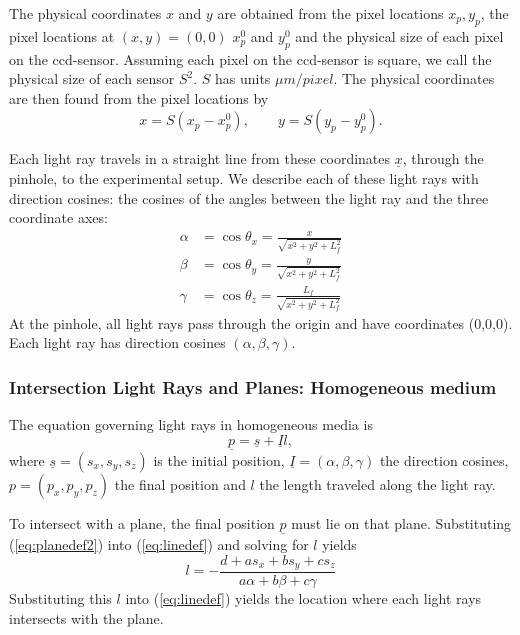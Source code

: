 \documentclass{article}
\begin{document}
The physical coordinates $x$ and $y$ are obtained from the pixel locations $x_p, y_p$, the pixel locations at $(x,y)=(0,0)$ $x_p^0$ and $y_p^0$ and the physical size of each pixel on the ccd-sensor. Assuming each pixel on the ccd-sensor is square, we call the physical size of each sensor $S^2$. $S$ has units $\mu m/pixel$. The physical coordinates are then found from the pixel locations by
\begin{equation}
	x = S (x_p-x_p^0), \qquad  y = S (y_p-y_p^0).
\end{equation}

Each light ray travels in a straight line from these coordinates $\underline{x}$, through the pinhole, to the experimental setup. We describe each of these light rays with direction cosines: the cosines of the angles between the light ray and the three coordinate axes:
\begin{align}
\label{eq:directioncosines}
	\alpha &= \cos \theta_x = \frac{x}{\sqrt{x^2+y^2+L_f^2}} \nonumber \\
	\beta &= \cos \theta_y = \frac{y}{\sqrt{x^2+y^2+L_f^2}} \\
	\gamma &= \cos \theta_z = \frac{L_f}{\sqrt{x^2+y^2+L_f^2}} \nonumber
\end{align}
At the pinhole, all light rays pass through the origin and have coordinates (0,0,0). Each light ray has direction cosines $(\alpha, \beta, \gamma)$.

\subsubsection{Intersection Light Rays and Planes: Homogeneous medium}
The equation governing light rays in homogeneous media is
\begin{equation}
	\label{eq:linedef}
   \underline{p} = \underline{s} + \underline{I} l,
\end{equation}
where $\underline{s} = (s_x, s_y, s_z)$ is the initial position, $\underline{I} = (\alpha, \beta, \gamma)$ the direction cosines, $p = (p_x, p_y, p_z)$ the final position and $l$ the length traveled along the light ray. %

To intersect with a plane, the final position $\underline{p}$ must lie on that plane. Substituting (\ref{eq:planedef2}) into (\ref{eq:linedef}) and solving for $l$ yields 
\begin{equation}
	l = - \frac{d + a s_x + b s_y + c s_z}{a \alpha + b \beta + c \gamma}
\end{equation}
Substituting this $l$ into (\ref{eq:linedef}) yields the location where each light rays intersects with the plane.
\end{document}
